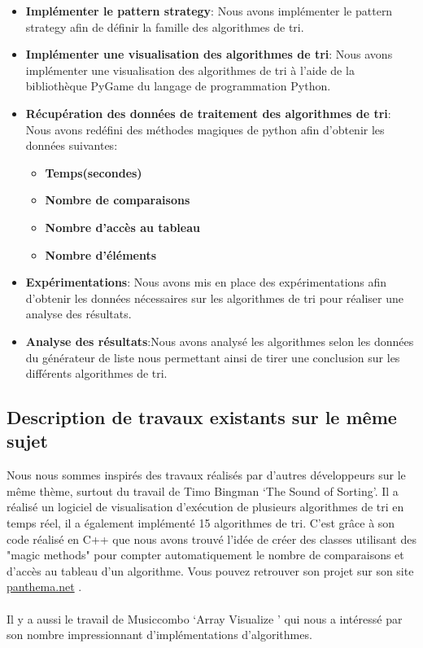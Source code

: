\documentclass[10pt,a4paper]{article}
\begin{document}
\begin{itemize}
            \item \textbf{Implémenter le pattern strategy}: Nous avons implémenter le pattern strategy afin de définir la famille des algorithmes de tri.
            
            \item \textbf{Implémenter une visualisation des algorithmes de tri}: Nous avons implémenter une visualisation des algorithmes de tri à l'aide de la bibliothèque PyGame du langage de programmation Python.

            
            \item \textbf{Récupération des données de traitement des algorithmes de tri}:
            Nous avons redéfini des méthodes magiques de python afin d'obtenir les données suivantes: 
            
                \begin{itemize}  
                    \item \textbf{Temps(secondes)}
                    \item \textbf{Nombre de comparaisons} 
                    \item \textbf{Nombre d'accès au tableau}
                    \item \textbf{Nombre d'éléments}
                \end{itemize}
        

   
            \item \textbf{Expérimentations}: Nous avons mis en place des expérimentations afin d'obtenir les données nécessaires sur les algorithmes de tri pour réaliser une analyse des résultats.

            \item \textbf{Analyse des résultats}:Nous avons analysé les algorithmes selon les données du générateur de liste nous permettant ainsi de tirer une conclusion sur les différents algorithmes de tri.
            
        \end{itemize}

        
    \subsection{Description de travaux existants sur le même sujet}
     Nous nous sommes inspirés des travaux réalisés par d’autres développeurs sur le même thème, surtout du travail de Timo Bingman ‘The Sound of Sorting’. 
     Il a réalisé un logiciel de visualisation d’exécution de plusieurs algorithmes de tri en temps réel, il a également implémenté 15 algorithmes de tri. C’est grâce à son code réalisé en C++ que nous avons trouvé l’idée de créer des classes utilisant des "magic methods" pour compter automatiquement le nombre de comparaisons et d'accès au tableau d’un algorithme. Vous pouvez retrouver son projet sur son site  \href{https://panthema.net/}{panthema.net} .\\\\
     Il y a aussi le travail de Musiccombo ‘Array Visualize ’ qui nous a intéressé par son nombre impressionnant d’implémentations d’algorithmes. 
\end{document}

